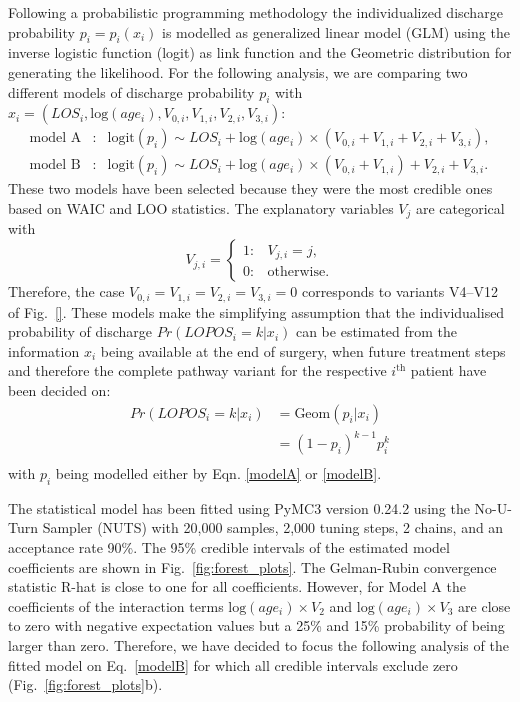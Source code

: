 Following a probabilistic programming methodology the individualized discharge probability $p_i = p_i(x_i)$ is modelled as generalized linear model (GLM) using the inverse logistic function (logit) as link function and the Geometric distribution for generating the likelihood. 
For the following analysis, we are comparing two different models of discharge probability $p_i$ with $x_i = (LOS_i, \text{log}(age_i), V_{0,i}, V_{1, i}, V_{2, i}, V_{3, i})$: 
\begin{eqnarray}
\label{modelA}\text{model A}&:& \text{logit}(p_i) \sim LOS_i + \text{log}(age_i) \times (V_{0,i} + V_{1,i} + V_{2,i} + V_{3,i}),\\
\label{modelB}\text{model B}&:& \text{logit}(p_i) \sim LOS_i + \text{log}(age_i) \times (V_{0,i} + V_{1,i}) + V_{2,i} + V_{3,i}. 
\end{eqnarray}
These two models have been selected because they were the most credible ones based on WAIC and LOO statistics. The explanatory variables $V_{j}$ are categorical with 
\begin{equation}
V_{j,i} = \begin{cases}
	1: & V_{j,i} = j,\\
        0: & \text{otherwise}.
\end{cases}
\end{equation}
Therefore, the case $V_{0,i}=V_{1,i}=V_{2,i}=V_{3,i}=0$ corresponds to variants V4--V12 of Fig.~\ref{}.
These models make the simplifying assumption that the individualised probability of discharge $Pr(LOPOS_i=k|x_i)$ can be estimated from the information $x_i$ being available at the end of surgery, when future treatment steps and therefore the complete pathway variant for the respective $i^\text{th}$ patient have been decided on:
\begin{equation}
\begin{split}
Pr(LOPOS_i=k|x_i) & = \text{Geom}(p_i|x_i) \\
                  & = (1-p_i)^{k-1}p_i^{k} \\
\end{split}
\end{equation}
with $p_i$ being modelled either by Eqn. \eqref{modelA} or \eqref{modelB}.

The statistical model has been fitted using PyMC3 \citep{Salvatier2016_PyMC3} version 0.24.2 using the No-U-Turn Sampler (NUTS) with 20,000 samples, 2,000 tuning steps, 2 chains, and an acceptance rate 90\%. The 95\% credible intervals of the estimated model coefficients are shown in Fig.~\ref{fig:forest_plots}. The Gelman-Rubin convergence statistic R-hat is close to one for all coefficients. 
However, for Model A the coefficients of the interaction terms $\text{log}(age_i)\times V_2$ and $\text{log}(age_i)\times V_3$ are close to zero with negative expectation values but a 25\% and 15\% probability of being larger than zero. 
Therefore, we have decided to focus the following analysis of the fitted model on Eq.~\ref{modelB} for which all credible intervals exclude zero (Fig.~\ref{fig:forest_plots}b).

